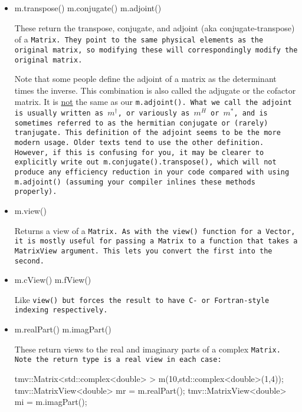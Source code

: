 \begin{itemize}
\item
\begin{tmvcode}
m.transpose()
m.conjugate()
m.adjoint()
\end{tmvcode}
These return the transpose, conjugate, and adjoint (aka conjugate-transpose) 
of a \tt{Matrix}.  They point to the 
same physical elements as the original matrix, so modifying these will
correspondingly modify the original matrix.

Note that some people define the adjoint of a matrix as the determinant times
the inverse.  This combination is also called the adjugate or the cofactor matrix.
It is \underline{not} the same as our \tt{m.adjoint()}.  What we call the adjoint 
is usually written as $m^\dagger$, or variously as $m^H$ or $m^*$, 
and is sometimes referred to as the hermitian conjugate
or (rarely) tranjugate.  This definition of the adjoint seems to be the more modern
usage.  Older texts tend to use the other definition.  However, if this is confusing
for you, it may be clearer to explicitly write out \tt{m.conjugate().transpose()},
which will not produce any efficiency reduction in your code compared with using
\tt{m.adjoint()} (assuming your compiler inlines these methods properly).

\item
\begin{tmvcode}
m.view()
\end{tmvcode}
Returns a view of a \tt{Matrix}.  As with the \tt{view()} function for a \tt{Vector}, it is mostly
useful for passing a \tt{Matrix} to a function that takes a \tt{MatrixView} argument.  
This lets you convert the first into the second.

\item
\begin{tmvcode}
m.cView()
m.fView()
\end{tmvcode}
Like \tt{view()} but forces the result to have C- or Fortran-style indexing respectively.

\item
\begin{tmvcode}
m.realPart()
m.imagPart()
\end{tmvcode}
These return views to the real and imaginary parts of a complex \tt{Matrix}.
Note the return type is a real view in each case:
\begin{tmvcode}
tmv::Matrix<std::complex<double> > m(10,std::complex<double>(1,4));
tmv::MatrixView<double> mr = m.realPart();
tmv::MatrixView<double> mi = m.imagPart();
\end{tmvcode}


\end{itemize}
